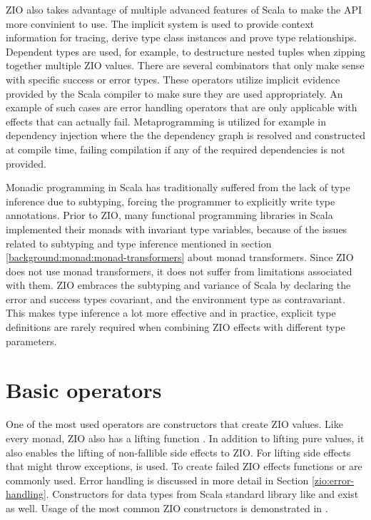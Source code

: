 ZIO also takes advantage of multiple advanced features of Scala to make the API more convinient to use. The implicit system is used to provide context information for tracing, derive type class instances and prove type relationships. Dependent types are used, for example, to destructure nested tuples when zipping together multiple ZIO values. There are several combinators that only make sense with specific success or error types. These operators utilize implicit evidence provided by the Scala compiler to make sure they are used appropriately. An example of such cases are error handling operators that are only applicable with effects that can actually fail. Metaprogramming is utilized for example in dependency injection where the the dependency graph is resolved and constructed at compile time, failing compilation if any of the required dependencies is not provided.

Monadic programming in Scala has traditionally suffered from the lack of type inference due to subtyping, forcing the programmer to explicitly write type annotations.
Prior to ZIO, many functional programming libraries in Scala implemented their monads with invariant type variables, because of the issues related to subtyping and type inference mentioned in section \ref{background:monad:monad-transformers} about monad transformers. Since ZIO does not use monad transformers, it does not suffer from limitations associated with them. ZIO embraces the subtyping and variance of Scala by declaring the error and success types covariant, and the environment type as contravariant. This makes type inference a lot more effective and in practice, explicit type definitions are rarely required when combining ZIO effects with different type parameters.



\section{Basic operators}
One of the most used operators are constructors that create ZIO values. Like every monad, ZIO also has a lifting function . In addition to lifting pure values, it also enables the lifting of non-fallible side effects to ZIO. For lifting side effects that might throw exceptions,  is used. To create failed ZIO effects functions  or  are commonly used. Error handling is discussed in more detail in Section \ref{zio:error-handling}. Constructors for data types from Scala standard library like  and  exist as well. Usage of the most common ZIO constructors is demonstrated in .

